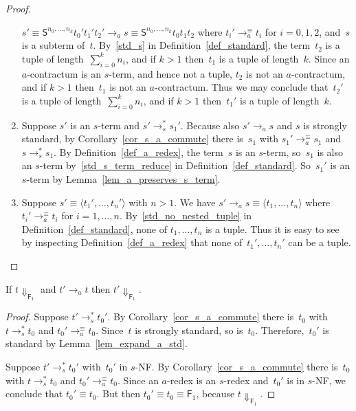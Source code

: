 \documentclass[a4paper,UKenglish]{lipics-v2016}
\newcommand{\Fs}{\mathsf{F}}
\newcommand{\Ss}{\mathsf{S}}
\newcommand{\Da}{\ensuremath{\Downarrow}}
\newcommand{\la}{\ensuremath{\langle}}
\newcommand{\ra}{\ensuremath{\rangle}}
\begin{document}
\begin{proof}
\begin{enumerate}
    $s' \equiv \Ss^{n_0,\ldots,n_k} t_0' t_1' t_2' \to_a s \equiv
    \Ss^{n_0,\ldots,n_k} t_0 t_1 t_2$ where $t_i' \to_a^{\equiv} t_i$
    for $i=0,1,2$, and~$s$ is a subterm of~$t$. By~\ref{std_s} in
    Definition~\ref{def_standard}, the term~$t_2$ is a tuple of
    length~$\sum_{i=0}^kn_i$, and if $k > 1$ then~$t_1$ is a tuple of
    length~$k$. Since an $a$-contractum is an $s$-term, and hence not
    a tuple, $t_2$ is not an $a$-contractum, and if $k > 1$ then~$t_1$
    is not an $a$-contractum. Thus we may conclude that~$t_2'$ is a
    tuple of length~$\sum_{i=0}^kn_i$, and if $k > 1$ then~$t_1'$ is a
    tuple of length~$k$.
  \item Suppose $s'$ is an $s$-term and $s' \to_s^{*} s_1'$. Because
    also $s' \to_a s$ and $s$ is strongly standard, by
    Corollary~\ref{cor_s_a_commute} there is~$s_1$ with
    $s_1' \to_a^{\equiv} s_1$ and $s \to_s^{*} s_1$. By
    Definition~\ref{def_a_redex}, the term~$s$ is an $s$-term,
    so~$s_1$ is also an $s$-term by~\ref{std_s_term_reduce} in
    Definition~\ref{def_standard}. So~$s_1'$ is an $s$-term by
    Lemma~\ref{lem_a_preserves_s_term}.
  \item Suppose $s' \equiv \la t_1',\ldots,t_n' \ra$ with $n > 1$. We
    have $s' \to_a s \equiv \la t_1,\ldots,t_n \ra$ where $t_i'
    \to_a^{\equiv} t_i$ for
    $i=1,\ldots,n$. By~\ref{std_no_nested_tuple} in
    Definition~\ref{def_standard}, none of $t_1,\ldots,t_n$ is a
    tuple. Thus it is easy to see by inspecting
    Definition~\ref{def_a_redex} that none of~$t_1',\ldots,t_n'$ can
    be a tuple.
  \end{enumerate}
\end{proof}

\begin{lemma}\label{lem_expand_a}
  If $t \Da_{\Fs_1}$ and $t' \to_a t$ then $t' \Da_{\Fs_1}$.
\end{lemma}

\begin{proof}
  Suppose $t' \to_s^{*} t_0'$. By Corollary~\ref{cor_s_a_commute}
  there is~$t_0$ with $t \to_s^{*} t_0$ and $t_0' \to_a^{\equiv}
  t_0$. Since~$t$ is strongly standard, so is~$t_0$. Therefore,~$t_0'$
  is standard by Lemma~\ref{lem_expand_a_std}.

  Suppose $t' \to_s^{*} t_0'$ with~$t_0'$ in $s$-NF. By
  Corollary~\ref{cor_s_a_commute} there is~$t_0$ with
  $t \to_s^{*} t_0$ and $t_0' \to_a^{\equiv} t_0$. Since an $a$-redex
  is an $s$-redex and~$t_0'$ is in $s$-NF, we conclude that
  $t_0' \equiv t_0$. But then $t_0' \equiv t_0 \equiv \Fs_1$, because
  $t \Da_{\Fs_1}$.
\end{proof}
\end{document}
